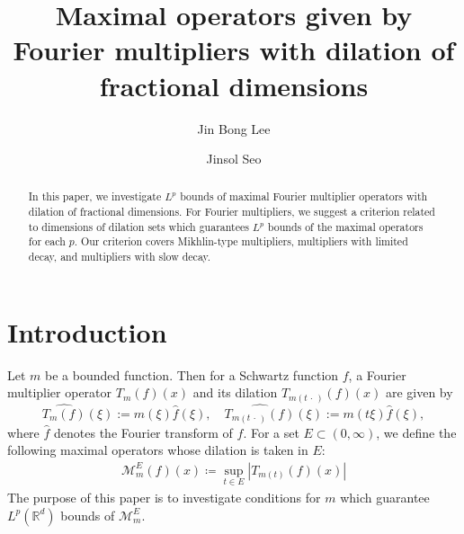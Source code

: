 \documentclass[11pt]{amsart}
\theoremstyle{plain}
\theoremstyle{definition}
\theoremstyle{remark}
\numberwithin{equation}{section}
\newcommand{\bR}{\mathbb{R}}
\begin{document}
\title[Maximal operators with fractal dimension dilation]
{Maximal operators given by Fourier multipliers with dilation of fractional dimensions}




\author[J. B. Lee]{Jin Bong Lee}
\address[J. B. Lee]{Research Institute of Mathematics, Seoul National University, Seoul 08826, Republic of Korea}

\author[J. Seo]{Jinsol Seo}
\address[J. Seo]{School of Mathematics, Korea Institute for Advanced Study, 85 Hoegiro Dongdaemun-gu, Seoul 02455, Republic of Korea}





\begin{abstract}
    In this paper, we investigate $L^p$ bounds of maximal Fourier multiplier operators with dilation of fractional dimensions.
    For Fourier multipliers, we suggest a criterion related to dimensions of dilation sets which guarantees $L^p$ bounds of the maximal operators for each $p$.
    Our criterion covers Mikhlin-type multipliers, multipliers with limited decay, and multipliers with slow decay.
\end{abstract}


\maketitle

\section{Introduction}


Let $m$ be a bounded function.
Then for a Schwartz function $f$, a Fourier multiplier operator $T_m(f)(x)$ and its dilation $T_{m(t\,\cdot\,)}(f)(x)$ are given by
$$
    \widehat{T_m(f)}(\xi) := m(\xi)\widehat{f}(\xi),\quad
    \widehat{T_{m(t\,\cdot\,)}(f)}(\xi) := m(t\xi)\widehat{f}(\xi),
$$
where $\widehat{f}$ denotes the Fourier transform of $f$.
For a set $E\subset (0,\infty)$, we define the following maximal operators whose dilation is taken in $E$:
\begin{align*}
    \mathcal{M}_m^E(f)(x) \coloneqq \sup_{t\in E}\left|T_{m(t)}(f)(x)\right|
\end{align*}
The purpose of this paper is to investigate conditions for $m$ which guarantee $L^p(\bR^d)$ bounds of $\mathcal{M}_m^E$.
\end{document}
